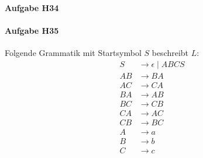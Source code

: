 \documentclass[11pt]{article}
\begin{document}
\paragraph{Aufgabe H34}


\paragraph{Aufgabe H35} Folgende Grammatik mit Startsymbol $S$ beschreibt $L$:
\begin{align*}
S &\rightarrow \epsilon \mid ABCS	\\
AB &\rightarrow BA					\\
AC &\rightarrow CA					\\
BA &\rightarrow AB					\\
BC &\rightarrow CB					\\
CA &\rightarrow AC					\\
CB &\rightarrow BC					\\
A &\rightarrow a					\\
B &\rightarrow b					\\
C &\rightarrow c					\\
\end{align*}
\end{document}
